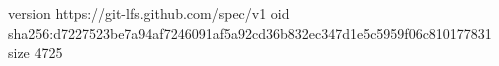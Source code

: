 version https://git-lfs.github.com/spec/v1
oid sha256:d7227523be7a94af7246091af5a92cd36b832ec347d1e5c5959f06c810177831
size 4725
